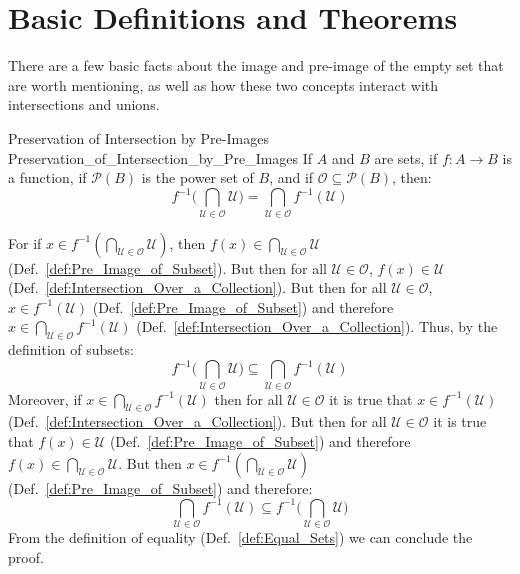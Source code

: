 \section{Basic Definitions and Theorems}
    There are a few basic facts about the image and pre-image of the empty set
    that are worth mentioning, as well as how these two concepts interact with
    intersections and unions.
    \begin{ftheorem}{Preservation of Intersection by Pre-Images}
                    {Preservation_of_Intersection_by_Pre_Images}
        If $A$ and $B$ are sets, if $f:A\rightarrow{B}$ is a function, if
        $\mathcal{P}(B)$ is the power set of $B$, and if
        $\mathcal{O}\subseteq\mathcal{P}(B)$, then:
        \begin{equation*}
            f^{\minus{1}}\Big(
                \bigcap_{\mathcal{U}\in\mathcal{O}}\mathcal{U}\Big)
            =\bigcap_{\mathcal{U}\in\mathcal{O}}f^{\minus{1}}(\mathcal{U})
        \end{equation*}
    \end{ftheorem}
    \begin{bproof}
        For if
        $x\in{f}^{\minus{1}}(\bigcap_{\mathcal{U}\in\mathcal{O}}\mathcal{U})$,
        then $f(x)\in\bigcap_{\mathcal{U}\in\mathcal{O}}\mathcal{U}$
        (Def.~\ref{def:Pre_Image_of_Subset}). But then for all
        $\mathcal{U}\in\mathcal{O}$, $f(x)\in\mathcal{U}$
        (Def.~\ref{def:Intersection_Over_a_Collection}). But then for all
        $\mathcal{U}\in\mathcal{O}$, $x\in{f}^{\minus{1}}(\mathcal{U})$
        (Def.~\ref{def:Pre_Image_of_Subset}) and therefore
        $x\in\bigcap_{\mathcal{U}\in\mathcal{O}}f^{\minus{1}}(\mathcal{U})$
        (Def.~\ref{def:Intersection_Over_a_Collection}). Thus, by the definition
        of subsets:
        \begin{equation}
            f^{\minus{1}}\Big(
                \bigcap_{\mathcal{U}\in\mathcal{O}}\mathcal{U}\Big)
            \subseteq\bigcap_{\mathcal{U}\in\mathcal{O}}
                f^{\minus{1}}(\mathcal{U})
        \end{equation}
        Moreover, if
        $x\in\bigcap_{\mathcal{U}\in\mathcal{O}}f^{\minus{1}}(\mathcal{U})$ then
        for all $\mathcal{U}\in\mathcal{O}$ it is true that
        $x\in{f}^{\minus{1}}(\mathcal{U})$
        (Def.~\ref{def:Intersection_Over_a_Collection}). But then for all
        $\mathcal{U}\in\mathcal{O}$ it is true that $f(x)\in\mathcal{U}$
        (Def.~\ref{def:Pre_Image_of_Subset}) and therefore
        $f(x)\in\bigcap_{\mathcal{U}\in\mathcal{O}}\mathcal{U}$. But then
        $x\in{f}^{\minus{1}}(\bigcap_{\mathcal{U}\in\mathcal{O}}\mathcal{U})$
        (Def.~\ref{def:Pre_Image_of_Subset}) and therefore:
        \begin{equation}
            \bigcap_{\mathcal{U}\in\mathcal{O}}f^{\minus{1}}(\mathcal{U})
            \subseteq{f}^{\minus{1}}\Big(
                \bigcap_{\mathcal{U}\in\mathcal{O}}\mathcal{U}\Big)
        \end{equation}
        From the definition of equality
        (Def.~\ref{def:Equal_Sets}) we can conclude the proof.
    \end{bproof}
